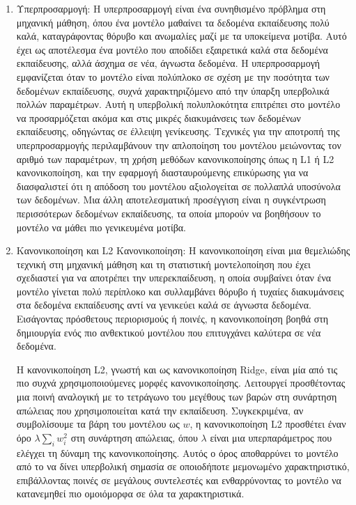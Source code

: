\begin{enumerate}
    \item Υπερπροσαρμογή: Η υπερπροσαρμογή είναι ένα συνηθισμένο πρόβλημα στη μηχανική μάθηση, όπου ένα μοντέλο μαθαίνει τα δεδομένα εκπαίδευσης πολύ καλά, καταγράφοντας θόρυβο και ανωμαλίες μαζί με τα υποκείμενα μοτίβα. Αυτό έχει ως αποτέλεσμα ένα μοντέλο που αποδίδει εξαιρετικά καλά στα δεδομένα εκπαίδευσης, αλλά άσχημα σε νέα, άγνωστα δεδομένα. Η υπερπροσαρμογή εμφανίζεται όταν το μοντέλο είναι πολύπλοκο σε σχέση με την ποσότητα των δεδομένων εκπαίδευσης, συχνά χαρακτηριζόμενο από την ύπαρξη υπερβολικά πολλών παραμέτρων. Αυτή η υπερβολική πολυπλοκότητα επιτρέπει στο μοντέλο να προσαρμόζεται ακόμα και στις μικρές διακυμάνσεις των δεδομένων εκπαίδευσης, οδηγώντας σε έλλειψη γενίκευσης. Τεχνικές για την αποτροπή της υπερπροσαρμογής περιλαμβάνουν την απλοποίηση του μοντέλου μειώνοντας τον αριθμό των παραμέτρων, τη χρήση μεθόδων κανονικοποίησης όπως η L1 ή L2 κανονικοποίηση, και την εφαρμογή διασταυρούμενης επικύρωσης για να διασφαλιστεί ότι η απόδοση του μοντέλου αξιολογείται σε πολλαπλά υποσύνολα των δεδομένων. Μια άλλη αποτελεσματική προσέγγιση είναι η συγκέντρωση περισσότερων δεδομένων εκπαίδευσης, τα οποία μπορούν να βοηθήσουν το μοντέλο να μάθει πιο γενικευμένα μοτίβα. 

    \item Κανονικοποίηση και L2 Κανονικοποίηση: Η κανονικοποίηση είναι μια θεμελιώδης τεχνική στη μηχανική μάθηση και τη στατιστική μοντελοποίηση που έχει σχεδιαστεί για να αποτρέπει την υπερεκπαίδευση, η οποία συμβαίνει όταν ένα μοντέλο γίνεται πολύ περίπλοκο και συλλαμβάνει θόρυβο ή τυχαίες διακυμάνσεις στα δεδομένα εκπαίδευσης αντί να γενικεύει καλά σε άγνωστα δεδομένα. Εισάγοντας πρόσθετους περιορισμούς ή ποινές, η κανονικοποίηση βοηθά στη δημιουργία ενός πιο ανθεκτικού μοντέλου που επιτυγχάνει καλύτερα σε νέα δεδομένα. 

    Η κανονικοποίηση L2, γνωστή και ως κανονικοποίηση Ridge, είναι μία από τις πιο συχνά χρησιμοποιούμενες μορφές κανονικοποίησης. Λειτουργεί προσθέτοντας μια ποινή αναλογική με το τετράγωνο του μεγέθους των βαρών στη συνάρτηση απώλειας που χρησιμοποιείται κατά την εκπαίδευση. Συγκεκριμένα, αν συμβολίσουμε τα βάρη του μοντέλου ως \( w \), η κανονικοποίηση L2 προσθέτει έναν όρο \(\lambda \sum_{i} w_i^2\) στη συνάρτηση απώλειας, όπου \(\lambda\) είναι μια υπερπαράμετρος που ελέγχει τη δύναμη της κανονικοποίησης. Αυτός ο όρος αποθαρρύνει το μοντέλο από το να δίνει υπερβολική σημασία σε οποιοδήποτε μεμονωμένο χαρακτηριστικό, επιβάλλοντας ποινές σε μεγάλους συντελεστές και ενθαρρύνοντας το μοντέλο να κατανεμηθεί πιο ομοιόμορφα σε όλα τα χαρακτηριστικά.
    

\end{enumerate}
